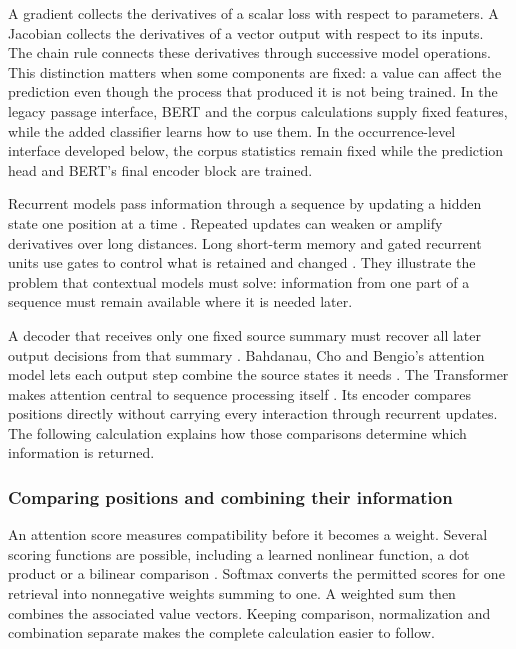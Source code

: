 \documentclass[10pt,letterpaper]{article}
\begin{document}
A gradient collects the derivatives of a scalar loss with respect to parameters. A Jacobian collects the derivatives of a vector output with respect to its inputs. The chain rule connects these derivatives through successive model operations. This distinction matters when some components are fixed: a value can affect the prediction even though the process that produced it is not being trained. In the legacy passage interface, BERT and the corpus calculations supply fixed features, while the added classifier learns how to use them. In the occurrence-level interface developed below, the corpus statistics remain fixed while the prediction head and BERT's final encoder block are trained.\par

Recurrent models pass information through a sequence by updating a hidden state one position at a time \cite{elman}. Repeated updates can weaken or amplify derivatives over long distances. Long short-term memory and gated recurrent units use gates to control what is retained and changed \cite{lstm,cho}. They illustrate the problem that contextual models must solve: information from one part of a sequence must remain available where it is needed later.\par

A decoder that receives only one fixed source summary must recover all later output decisions from that summary \cite{seq2seq}. Bahdanau, Cho and Bengio's attention model lets each output step combine the source states it needs \cite{bahdanau}. The Transformer makes attention central to sequence processing itself \cite{transformer}. Its encoder compares positions directly without carrying every interaction through recurrent updates. The following calculation explains how those comparisons determine which information is returned.\par

\subsubsection{Comparing positions and combining their information}
An attention score measures compatibility before it becomes a weight. Several scoring functions are possible, including a learned nonlinear function, a dot product or a bilinear comparison \cite{luong}. Softmax converts the permitted scores for one retrieval into nonnegative weights summing to one. A weighted sum then combines the associated value vectors. Keeping comparison, normalization and combination separate makes the complete calculation easier to follow.\par
\end{document}

